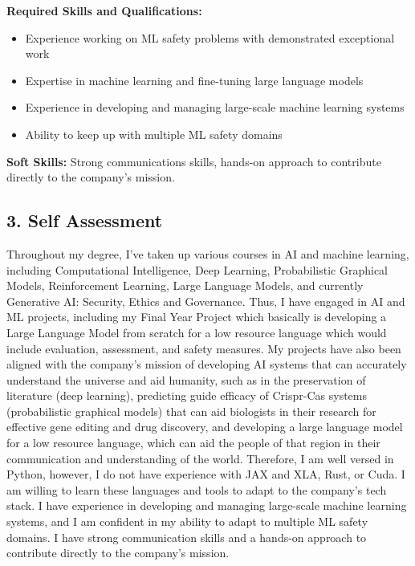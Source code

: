 \documentclass{article}
\theoremstyle{mytheoremstyle}
\theoremstyle{mytheoremstyle}
\theoremstyle{myproblemstyle}
\begin{document}
\noindent \textbf{Required Skills and Qualifications:}
\begin{itemize}
    \item Experience working on ML safety problems with demonstrated exceptional work
    \item Expertise in machine learning and fine-tuning large language models
    \item Experience in developing and managing large-scale machine learning systems
    \item Ability to keep up with multiple ML safety domains
\end{itemize}

\noindent \textbf{Soft Skills:} Strong communications skills, hands-on approach to contribute directly to the company's mission. 

\subsection*{3. Self Assessment}

\noindent Throughout my degree, I've taken up various courses in AI and machine learning, including Computational Intelligence, Deep Learning, Probabilistic Graphical Models, Reinforcement Learning, Large Language Models, and currently Generative AI: Security, Ethics and Governance. Thus, I have engaged in AI and ML projects, including my Final Year Project which basically is developing a Large Language Model from scratch for a low resource language which would include evaluation, assessment, and safety measures. My projects have also been aligned with the company's mission of developing AI systems that can accurately understand the universe and aid humanity, such as in the preservation of literature (deep learning), predicting guide efficacy of Crispr-Cas systems (probabilistic graphical models) that can aid biologists in their research for effective gene editing and drug discovery, and developing a large language model for a low resource language, which can aid the people of that region in their communication and understanding of the world. Therefore, I am well versed in Python, however, I do not have experience with JAX and XLA, Rust, or Cuda. I am willing to learn these languages and tools to adapt to the company's tech stack. I have experience in developing and managing large-scale machine learning systems, and I am confident in my ability to adapt to multiple ML safety domains. I have strong communication skills and a hands-on approach to contribute directly to the company's mission.
\end{document}
